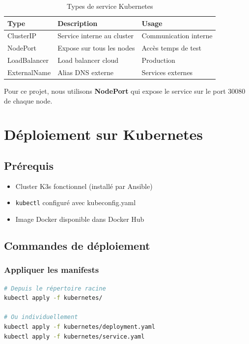 \documentclass[12pt,a4paper,twoside]{report}
\begin{document}
\begin{table}[H]
    \centering
    \caption{Types de service Kubernetes}
    \begin{tabular}{|l|p{5cm}|l|}
        \hline
        \textbf{Type} & \textbf{Description} & \textbf{Usage} \\
        \hline
        ClusterIP & Service interne au cluster & Communication interne \\
        NodePort & Expose sur tous les nodes & Accès temps de test \\
        LoadBalancer & Load balancer cloud & Production \\
        ExternalName & Alias DNS externe & Services externes \\
        \hline
    \end{tabular}
\end{table}

Pour ce projet, nous utilisons \textbf{NodePort} qui expose le service sur le port 30080 de chaque node.

\section{Déploiement sur Kubernetes}

\subsection{Prérequis}

\begin{itemize}
    \item Cluster K3s fonctionnel (installé par Ansible)
    \item \texttt{kubectl} configuré avec kubeconfig.yaml
    \item Image Docker disponible dans Docker Hub
\end{itemize}

\subsection{Commandes de déploiement}

\subsubsection{Appliquer les manifests}

\begin{lstlisting}[language=bash]
# Depuis le répertoire racine
kubectl apply -f kubernetes/

# Ou individuellement
kubectl apply -f kubernetes/deployment.yaml
kubectl apply -f kubernetes/service.yaml
\end{lstlisting}
\end{document}
